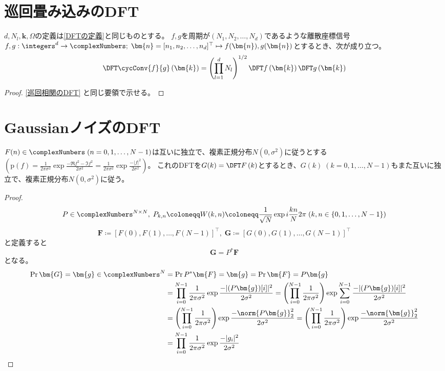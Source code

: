     \section{巡回畳み込みのDFT}
        \begin{shadebox}
            $d,N_l,\bm{k},\Omega$の定義は\ref{DFTの定義}と同じものとする。
            $f,g$を周期が$(N_1,N_2,\dots,N_d)$であるような離散座標信号$f,g: \integers^d\to\complexNumbers;\;\bm{n} = [n_1,n_2,\dots,n_d]^\top \mapsto f(\bm{n}),g(\bm{n})$とするとき、次が成り立つ。
            \[ \DFTwithArg{\cycConv{f}{g}}{\bm{k}} = \left(\prod_{l=1}^d N_l\right)^{1/2}\DFTwithArg{f}{\bm{k}}\DFTwithArg{g}{\bm{k}} \]
        \end{shadebox}
        \begin{proof}
            \quad\par
            \ref{巡回相関のDFT} と同じ要領で示せる。
        \end{proof}
    \section{GaussianノイズのDFT}
        \begin{shadebox}
            $F(n) \in \complexNumbers\;(n=0,1,\dots,N-1)$は互いに独立で、複素正規分布$N(0,\sigma^2)$に従うとする$\left(\text{p}(f) = \frac{1}{2\pi\sigma^2}\exp\frac{-\Re{f}^2-\Im{f}^2}{2\sigma^2} = \frac{1}{2\pi\sigma^2}\exp\frac{-|f|^2}{2\sigma^2}\right)$。
            これのDFTを$G(k) = \DFTwithArg{F}{k}$とするとき、$G(k)\;(k=0,1,\dots,N-1)$もまた互いに独立で、複素正規分布$N(0,\sigma^2)$に従う。
        \end{shadebox}
        \begin{proof}
            \[ P \in \complexNumbers^{N\times N},\; P_{k,n} \coloneqq W(k,n) \coloneqq \frac{1}{\sqrt{N}}\exp i\frac{kn}{N}2\pi\;(k,n \in \{0,1,\dots,N-1\}) \]
            \[ \bm{F} \coloneqq [F(0), F(1), \dots, F(N-1)]^\top,\;\bm{G} \coloneqq [G(0), G(1), \dots, G(N-1)]^\top \]
            と定義すると
            \[ \bm{G} = P^*\bm{F} \]
            となる。
            \begin{align*}
                \Pr{\bm{G} = \bm{g} \in \complexNumbers^N} &= \Pr{P^*\bm{F} = \bm{g}} = \Pr{\bm{F} = P\bm{g}} \\
                &= \prod_{i=0}^{N-1}\frac{1}{2\pi\sigma^2} \exp\frac{-|(P\bm{g})[i]|^2}{2\sigma^2} = \left(\prod_{i=0}^{N-1}\frac{1}{2\pi\sigma^2}\right) \exp \sum_{i=0}^{N-1} \frac{-|(P\bm{g})[i]|^2}{2\sigma^2} \\
                &= \left(\prod_{i=0}^{N-1}\frac{1}{2\pi\sigma^2}\right) \exp \frac{-\norm{P\bm{g}}_2^2}{2\sigma^2} = \left(\prod_{i=0}^{N-1}\frac{1}{2\pi\sigma^2}\right) \exp \frac{-\norm{\bm{g}}_2^2}{2\sigma^2} \\
                &= \prod_{i=0}^{N-1}\frac{1}{2\pi\sigma^2} \exp \frac{-|g_i|^2}{2\sigma^2}
            \end{align*}
        \end{proof}